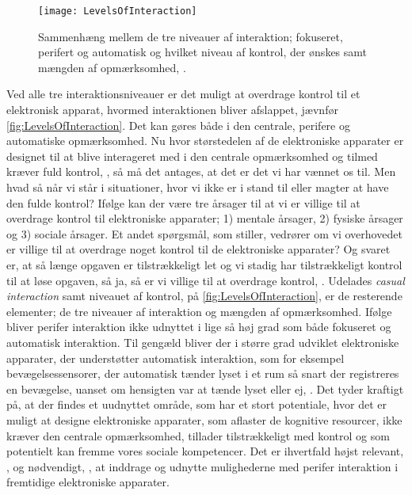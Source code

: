 %
\begin{figure}[H]
	\centering
	\texttt{[image: LevelsOfInteraction]}
	\caption{Sammenhæng mellem de tre niveauer af interaktion; fokuseret, perifert og automatisk og hvilket niveau af kontrol, der ønskes samt mængden af opmærksomhed,  \parencite[s. 118]{PDF:PeripheralInteraction}.}
	\label{fig:LevelsOfInteraction}
\end{figure}
\noindent
%
Ved alle tre interaktionsniveauer er det muligt at overdrage kontrol til et elektronisk apparat, hvormed interaktionen bliver afslappet, jævnfør \autoref{fig:LevelsOfInteraction}. Det kan gøres både i den centrale, perifere og automatiske opmærksomhed. Nu hvor størstedelen af de elektroniske apparater er designet til at blive interageret med i den centrale opmærksomhed og tilmed kræver fuld kontrol, \parencite[s. 118]{PDF:PeripheralInteraction}, så må det antages, at det er det vi har vænnet os til. Men hvad så når vi står i situationer, hvor vi ikke er i stand til eller magter at have den fulde kontrol? Ifølge \textcite[s. 123]{PDF:PeripheralInteraction} kan der være tre årsager til at vi er villige til at overdrage kontrol til elektroniske apparater; 1) mentale årsager, 2) fysiske årsager og 3) sociale årsager. Et andet spørgsmål, som \textcite[s. 124]{PDF:PeripheralInteraction} stiller, vedrører om vi overhovedet er villige til at overdrage noget kontrol til de elektroniske apparater? Og svaret er, at så længe opgaven er tilstrækkeligt let og vi stadig har tilstrækkeligt kontrol til at løse opgaven, så ja, så er vi villige til at overdrage kontrol, \parencite[s. 124]{PDF:PeripheralInteraction}.\blankline
%
Udelades \textit{casual interaction} samt niveauet af kontrol, på \autoref{fig:LevelsOfInteraction}, er de resterende elementer; de tre niveauer af interaktion og mængden af opmærksomhed. Ifølge \textcite[s. 6]{PDF:PeripheralInteraction} bliver perifer interaktion ikke udnyttet i lige så høj grad som både fokuseret og automatisk interaktion. Til gengæld bliver der i større grad udviklet elektroniske apparater, der understøtter automatisk interaktion, som for eksempel bevægelsessensorer, der automatisk tænder lyset i et rum så snart der registreres en bevægelse, uanset om hensigten var at tænde lyset eller ej, \parencite[s. 5]{PDF:PeripheralInteraction}.\blankline
% 
Det tyder kraftigt på, at der findes et uudnyttet område, som har et stort potentiale, hvor det er muligt at designe elektroniske apparater, som aflaster de kognitive resourcer, ikke kræver den centrale opmærksomhed, tillader tilstrækkeligt med kontrol og som potentielt kan fremme vores sociale kompetencer. Det er ihvertfald højst relevant, \parencite[s. 239]{PDF:PICharacteristicsAndConsiderations}, og nødvendigt, \parencite[s. 3]{PDF:TheComingAgeOfCalmTech}, at inddrage og udnytte mulighederne med perifer interaktion i fremtidige elektroniske apparater. 

